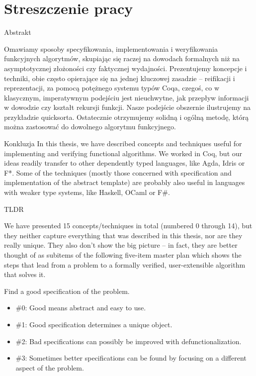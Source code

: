 \documentclass{beamer}
\begin{document}
\section{Streszczenie pracy}

\begin{frame}{Abstrakt}
\begin{center}
	Omawiamy sposoby specyfikowania, implementowania i weryfikowania funkcyjnych algorytmów, skupiając się raczej na dowodach formalnych niż na asymptotycznej złożoności czy faktycznej wydajności. Prezentujemy koncepcje i techniki, obie często opierające się na jednej kluczowej zasadzie -- reifikacji i reprezentacji, za pomocą potężnego systemu typów Coqa, czegoś, co w klasycznym, imperatywnym podejściu jest nieuchwytne, jak przepływ informacji w dowodzie czy kształt rekursji funkcji. Nasze podejście obszernie ilustrujemy na przykładzie quicksorta. Ostatecznie otrzymujemy solidną i ogólną metodę, którą można zastosować do dowolnego algorytmu funkcyjnego.
\end{center}
\end{frame}



\begin{frame}{Konkluzja}
	In this thesis, we have described concepts and techniques useful for implementing and verifying functional algorithms. We worked in Coq, but our ideas readily transfer to other dependently typed languages, like Agda, Idris or F*. Some of the techniques (mostly those concerned with specification and implementation of the abstract template) are probably also useful in languages with weaker type systems, like Haskell, OCaml or F\#.
\end{frame}

\begin{frame}{TLDR}
	
	We have presented 15 concepts/techniques in total (numbered 0 through 14), but they neither capture everything that was described in this thesis, nor are they really unique. They also don't show the big picture -- in fact, they are better thought of as subitems of the following five-item master plan which shows the steps that lead from a problem to a formally verified, user-extensible algorithm that solves it.
\end{frame}

\begin{frame}{Find a good specification of the problem.}
\begin{itemize}
	\item \#0: Good means abstract and easy to use.
	\item \#1: Good specification determines a unique object.
	\item \#2: Bad specifications can possibly be improved with defunctionalization.
	\item \#3: Sometimes better specifications can be found by focusing on a different aspect of the problem.
\end{itemize}
\end{frame}
\end{document}
